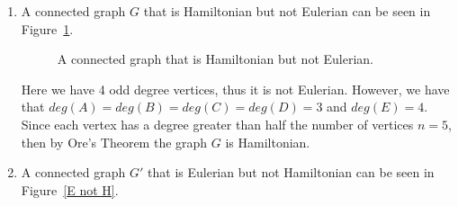 \documentclass[11pt, oneside]{article}   	%
\begin{document}
\begin{enumerate}[\quad (a)]

	\item A connected graph $G$ that is Hamiltonian but not Eulerian can be seen in Figure~\ref{H not E}.
	\begin{figure}[h]
            \centering
            
            
            \caption{A connected graph that is Hamiltonian but not Eulerian.}
            \label{H not E}
          \end{figure}
          
          Here we have 4 odd degree vertices, thus it is not Eulerian. However, we have that $deg(A)=deg(B)=deg(C)=deg(D)=3$ and $deg(E)=4$. Since each vertex has a degree greater than half the number of vertices $n=5$, then by Ore's Theorem the graph $G$ is Hamiltonian.
          
          \item A connected graph $G'$ that is Eulerian but not Hamiltonian can be seen in Figure~\ref{E not H}.
          
          \begin{figure}[h]
            \centering
            
\end{figure}
\end{enumerate}
\end{document}
